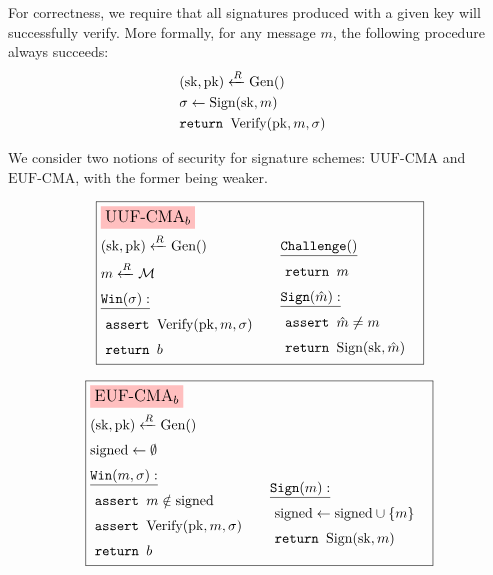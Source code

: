 For correctness, we require that all signatures produced with a given
key will successfully verify.
More formally, for any message $m$, the following procedure always succeeds:
$$
\begin{aligned}
&(\text{sk}, \text{pk}) \xleftarrow{R} \text{Gen}()\cr
&\sigma \gets \text{Sign}(\text{sk}, m)\cr
&\texttt{return } \text{Verify}(\text{pk}, m, \sigma)\cr
\end{aligned}
$$

We consider two notions of security for signature schemes:
$\text{UUF-CMA}$ and $\text{EUF-CMA}$, with the former being weaker.

\begin{game}
\captionsetup{justification=centering}
$$
\boxed{
\begin{aligned}
&\colorbox{pink}{\large $\text{UUF-CMA}_b$}\cr
&\begin{aligned}
    &(\text{sk}, \text{pk}) \xleftarrow{R} \text{Gen}()\cr
    &m \xleftarrow{R} \mathcal{M}\cr
    &\underline{\texttt{Win}(\sigma):}\cr
    &\ \texttt{assert } \text{Verify}(\text{pk}, m, \sigma)\cr
    &\ \texttt{return } b\cr
\end{aligned}
&\begin{aligned}
    &\underline{\texttt{Challenge}()}\cr
    &\ \texttt{return } m\cr
    &\underline{\texttt{Sign}(\hat{m}):}\cr
    &\ \texttt{assert } \hat{m} \neq m\cr
    &\ \texttt{return } \text{Sign}(\text{sk}, \hat{m})\cr
\end{aligned}\cr
\end{aligned}
}
$$
\caption{$\text{UUF-CMA}_b$}
\label{game:uuf-cma}
\end{game}
\begin{game}
\captionsetup{justification=centering}
$$
\boxed{
\begin{aligned}
&\colorbox{pink}{\large $\text{EUF-CMA}_b$}\cr
&(\text{sk}, \text{pk}) \xleftarrow{R} \text{Gen}()\cr
&\text{signed} \gets \emptyset\cr
&\begin{aligned}
    &\underline{\texttt{Win}(m, \sigma):}\cr
    &\ \texttt{assert } m \notin \text{signed}\cr
    &\ \texttt{assert } \text{Verify}(\text{pk}, m, \sigma)\cr
    &\ \texttt{return } b\cr
\end{aligned}
&\begin{aligned}
    &\underline{\texttt{Sign}(m):}\cr
    &\ \text{signed} \gets \text{signed} \cup \{m\}\cr
    &\ \texttt{return } \text{Sign}(\text{sk}, m)\cr
\end{aligned}\cr
\end{aligned}
}
$$
\caption{$\text{EUF-CMA}_b$}
\label{game:euf-cma}
\end{game}

